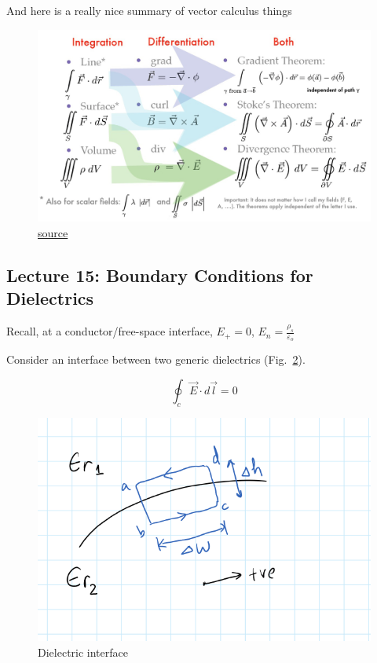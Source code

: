 \documentclass[10pt]{article}
\begin{document}
\begin{blockquote}
	And here is a really nice summary of vector calculus things

	\begin{figure}[H]
		\centering
		\includegraphics[width=0.8\linewidth]{img/259_vec_calc.png}
		\caption{\href{http://furqaanyusaf.com/notes/vectors/stokes-apply}{source}}
		\label{fig:259:vcalc}
	\end{figure}
	


		
\end{blockquote}





\subsection{Lecture 15: Boundary Conditions for Dielectrics}

\begin{remark}
	Recall, at a conductor/free-space interface, $E_+ = 0$, $E_n = \frac{\rho_s}{\varepsilon_o} $
\end{remark}


Consider an interface between two generic dielectrics (Fig.~\ref{fig:259:dielectric_interface_1}).

\begin{theorem}
	\begin{equation}
		\oint_c \vec{E} \cdot {d\vec{l}} = 0
		\label{eq:259:dielectric_interface_integral}
	\end{equation}
\end{theorem}


\begin{figure}[H]
	\includegraphics[width=0.5\linewidth]{img/dielectric_interface.png}
	\caption{Dielectric interface}
	\label{fig:259:dielectric_interface_1}
\end{figure}
\end{document}
